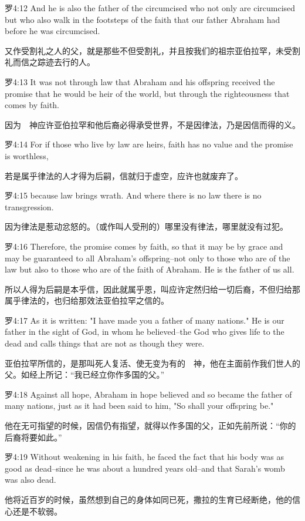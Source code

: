 \documentclass[a4paper,11pt,onecolumn,twoside]{ctexart}
\begin{document}
\begin{multicols}{2}
 罗4:12
 And he is also the father of the circumcised who not only are circumcised but who also walk in the footsteps of the faith that our father Abraham had before he was circumcised.

 又作受割礼之人的父，就是那些不但受割礼，并且按我们的祖宗亚伯拉罕，未受割礼而信之踪迹去行的人。


 罗4:13
 It was not through law that Abraham and his offspring received the promise that he would be heir of the world, but through the righteousness that comes by faith.

 因为　神应许亚伯拉罕和他后裔必得承受世界，不是因律法，乃是因信而得的义。


 罗4:14
 For if those who live by law are heirs, faith has no value and the promise is worthless,

 若是属乎律法的人才得为后嗣，信就归于虚空，应许也就废弃了。


 罗4:15
 because law brings wrath. And where there is no law there is no transgression.

 因为律法是惹动忿怒的。（或作叫人受刑的）哪里没有律法，哪里就没有过犯。


 罗4:16
 Therefore, the promise comes by faith, so that it may be by grace and may be guaranteed to all Abraham's offspring--not only to those who are of the law but also to those who are of the faith of Abraham. He is the father of us all.

 所以人得为后嗣是本乎信，因此就属乎恩，叫应许定然归给一切后裔，不但归给那属乎律法的，也归给那效法亚伯拉罕之信的。


 罗4:17
 As it is written: "I have made you a father of many nations." He is our father in the sight of God, in whom he believed--the God who gives life to the dead and calls things that are not as though they were.

 亚伯拉罕所信的，是那叫死人复活、使无变为有的　神，他在主面前作我们世人的父。如经上所记：“我已经立你作多国的父。”


 罗4:18
 Against all hope, Abraham in hope believed and so became the father of many nations, just as it had been said to him, "So shall your offspring be."

 他在无可指望的时候，因信仍有指望，就得以作多国的父，正如先前所说：“你的后裔将要如此。”


 罗4:19
 Without weakening in his faith, he faced the fact that his body was as good as dead--since he was about a hundred years old--and that Sarah's womb was also dead.

 他将近百岁的时候，虽然想到自己的身体如同已死，撒拉的生育已经断绝，他的信心还是不软弱。



\end{multicols}
\end{document}
